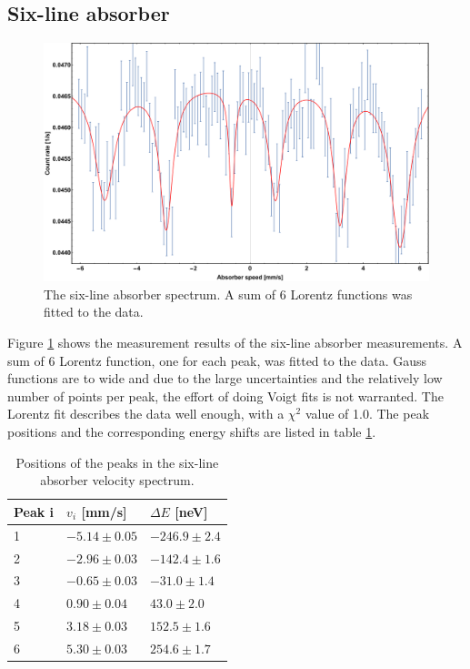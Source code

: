 \subsection{Six-line absorber}

\begin{figure}
\centering
\includegraphics[width=1.0\linewidth]{graphics/natureisen}
\caption[Six-line absorber peaks]{The six-line absorber spectrum. A sum of 6 Lorentz functions was fitted to the data.}
\label{fig:natureisen}
\end{figure}
Figure \ref{fig:natureisen} shows the measurement results of the six-line absorber measurements. A sum of 6 Lorentz function, one for each peak, was fitted to the data. Gauss functions are to wide and due to the large uncertainties and the relatively low number of points per peak, the effort of doing Voigt fits is not warranted. The Lorentz fit describes the data well enough, with a $\chi^2$ value of 1.0. The peak positions and the corresponding energy shifts are listed in table \ref{tb:peakpositions}.\\
\begin{table}\centering
	\begin{tabular}{@{}lll@{}}
		\toprule
		Peak i & $v_i$ [mm/s]&$\Delta E$ [neV]\\
		\midrule
		1 & $-5.14\pm0.05$ & $-246.9\pm2.4$ \\
		2 & $-2.96\pm0.03$ & $-142.4\pm1.6$ \\
		3 & $-0.65\pm0.03$ & $-31.0\pm1.4$ \\
		4 & $0.90\pm0.04$ & $43.0\pm2.0$ \\
		5 & $3.18\pm0.03$ & $152.5\pm1.6$ \\
		6 & $5.30\pm0.03$ & $254.6\pm1.7$\\
		\bottomrule
	\end{tabular}
	\caption[Six-line absorber peak positions]{Positions of the peaks in the six-line absorber velocity spectrum.}
	\label{tb:peakpositions}
\end{table}
